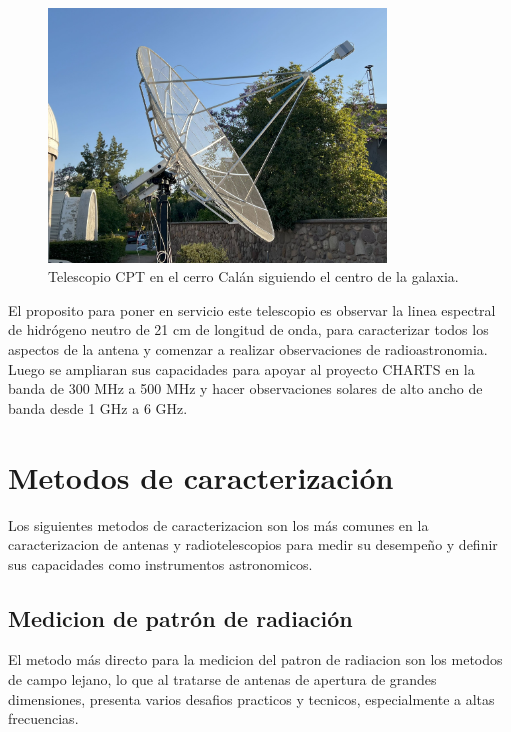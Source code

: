 \begin{figure}
    \centering
    \includegraphics[width = 0.8\textwidth]{img/cpt_tracking}
    \caption{Telescopio CPT en el cerro Calán siguiendo el centro de la galaxia.}
    \label{fig:cpt}
\end{figure}

El proposito para poner en servicio este telescopio es observar la linea espectral de hidrógeno neutro de 21 cm de longitud de onda, para caracterizar todos los aspectos de la antena y comenzar a realizar observaciones de radioastronomia. Luego se ampliaran sus capacidades para apoyar al proyecto CHARTS en la banda de 300 MHz a 500 MHz y hacer observaciones solares de alto ancho de banda desde 1 GHz a 6 GHz.\\

\section{Metodos de caracterización}

Los siguientes metodos de caracterizacion son los más comunes en la caracterizacion de antenas y radiotelescopios para medir su desempeño y definir sus capacidades como instrumentos astronomicos.\\

\subsection{Medicion de patrón de radiación}

El metodo más directo para la medicion del patron de radiacion son los metodos de campo lejano, lo que al tratarse de antenas de apertura de grandes dimensiones, presenta varios desafios practicos y tecnicos, especialmente a altas frecuencias\cite{Astudillo2014}.\\

